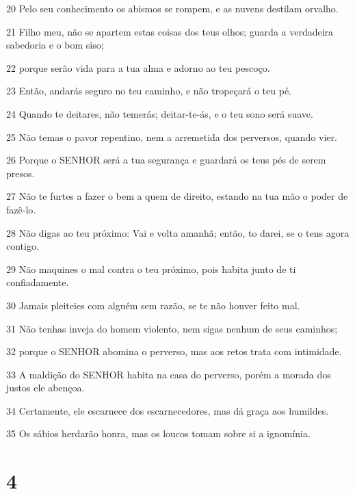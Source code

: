 \par 20 Pelo seu conhecimento os abismos se rompem, e as nuvens destilam orvalho.
\par 21 Filho meu, não se apartem estas coisas dos teus olhos; guarda a verdadeira sabedoria e o bom siso;
\par 22 porque serão vida para a tua alma e adorno ao teu pescoço.
\par 23 Então, andarás seguro no teu caminho, e não tropeçará o teu pé.
\par 24 Quando te deitares, não temerás; deitar-te-ás, e o teu sono será suave.
\par 25 Não temas o pavor repentino, nem a arremetida dos perversos, quando vier.
\par 26 Porque o SENHOR será a tua segurança e guardará os teus pés de serem presos.
\par 27 Não te furtes a fazer o bem a quem de direito, estando na tua mão o poder de fazê-lo.
\par 28 Não digas ao teu próximo: Vai e volta amanhã; então, to darei, se o tens agora contigo.
\par 29 Não maquines o mal contra o teu próximo, pois habita junto de ti confiadamente.
\par 30 Jamais pleiteies com alguém sem razão, se te não houver feito mal.
\par 31 Não tenhas inveja do homem violento, nem sigas nenhum de seus caminhos;
\par 32 porque o SENHOR abomina o perverso, mas aos retos trata com intimidade.
\par 33 A maldição do SENHOR habita na casa do perverso, porém a morada dos justos ele abençoa.
\par 34 Certamente, ele escarnece dos escarnecedores, mas dá graça aos humildes.
\par 35 Os sábios herdarão honra, mas os loucos tomam sobre si a ignomínia.

\chapter{4}

